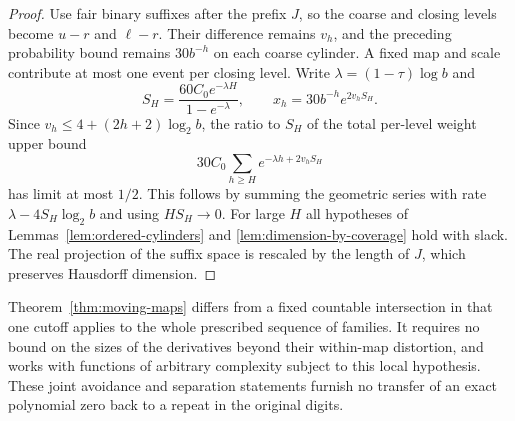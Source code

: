 \begin{proof}
Use fair binary suffixes after the prefix $J$, so the coarse and closing levels become $u-r$ and $\ell-r$. Their difference remains $v_h$, and the preceding probability bound remains $30b^{-h}$ on each coarse cylinder. A fixed map and scale contribute at most one event per closing level. Write $\lambda=(1-\tau)\log b$ and
\[
 S_H=\frac{60C_0 e^{-\lambda H}}{1-e^{-\lambda}},
 \qquad x_h=30b^{-h}e^{2v_hS_H}.
\]
Since $v_h\le4+(2h+2)\log_2 b$, the ratio to $S_H$ of the total per-level weight upper bound
\[
      30C_0\sum_{h\ge H}e^{-\lambda h+2v_hS_H}
\]
has limit at most $1/2$. This follows by summing the geometric series with rate $\lambda-4S_H\log_2 b$ and using $HS_H\to0$. For large $H$ all hypotheses of Lemmas~\ref{lem:ordered-cylinders} and \ref{lem:dimension-by-coverage} hold with slack. The real projection of the suffix space is rescaled by the length of $J$, which preserves Hausdorff dimension.
\end{proof}

Theorem~\ref{thm:moving-maps} differs from a fixed countable intersection in that one cutoff applies to the whole prescribed sequence of families. It requires no bound on the sizes of the derivatives beyond their within-map distortion, and works with functions of arbitrary complexity subject to this local hypothesis. These joint avoidance and separation statements furnish no transfer of an exact polynomial zero back to a repeat in the original digits.
